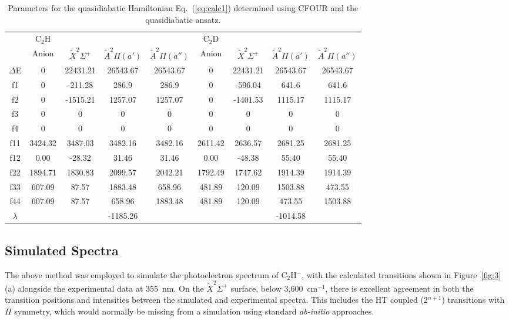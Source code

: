 \documentclass[journal=jpcafh,manuscript=article,layout=onecolumn, 12pt]{achemso}
\begin{document}
\begin{table}
	\caption{Parameters for the quasidiabatic Hamiltonian Eq.~(\ref{eq:calc1}) determined using CFOUR and the quasidiabatic ansatz.}
	\label{tab:1}
	\begin{tabular}{c |c c c c| c c c c }
		 & C$_2$H & &  & & C$_2$D & & & \\
		  & Anion & $\tilde{X}^2\Sigma^+$ & $\tilde{A}^2\Pi (a')$ & $\tilde{A}^2\Pi (a'')$ & Anion & $\tilde{X}^2\Sigma^+$ & $\tilde{A}^2\Pi (a')$ & $\tilde{A}^2\Pi (a'')$ \\
		 \hline\hline
		 $\Delta$E & 0 & 22431.21 &  26543.67 & 26543.67 & 0&	22431.21 & 26543.67	& 26543.67\\
		 f1 & 0	& -211.28 & 286.9 &	286.9 & 0& -596.04& 641.6 & 641.6\\
		 f2 & 0 & -1515.21 & 1257.07 & 1257.07 & 0 & -1401.53 & 1115.17 & 1115.17\\
		 f3 & 0 & 0 & 0 & 0 & 0 & 0 & 0 & 0 \\
		 f4 & 0 & 0 & 0 & 0 & 0 & 0 & 0 & 0 \\
         f11 & 3424.32 & 3487.03 & 3482.16 & 3482.16 & 2611.42 & 2636.57 & 2681.25 & 2681.25\\
         f12 & 0.00 & -28.32 & 31.46 & 31.46 & 0.00 & -48.38 & 55.40 & 55.40\\
         f22 & 1894.71 & 1830.83 & 2099.57 & 2042.21 & 1792.49 & 1747.62 & 1914.39 & 1914.39\\
         f33 & 607.09 & 87.57 & 1883.48 & 658.96 & 481.89 & 120.09 & 1503.88 & 473.55\\
         f44 & 607.09 & 87.57 & 658.96 & 1883.48 & 481.89 & 120.09 & 473.55 & 1503.88\\
         $\lambda$ &  & & -1185.26 &  &  & & -1014.58 &  \\
         \end{tabular}
\end{table}

\subsection{Simulated Spectra}
The above method was employed to simulate the photoelectron spectrum of C$_2$H$^-$, with the calculated transitions shown in Figure~\ref{fig:3}(a) alongside the experimental data at 355~nm. %
On the $\tilde{X} ^2\Sigma^+$ surface, below 3,600~cm$^{-1}$, there is excellent agreement in both the transition positions and intensities between the simulated and experimental spectra. This includes the HT coupled (2$^{n+1}$) transitions with $\Pi$ symmetry, which would normally be missing from a simulation using standard \emph{ab-initio} approaches. 
\end{document}
